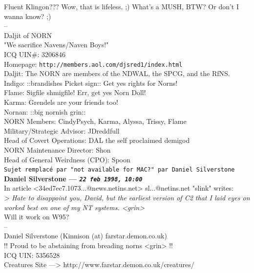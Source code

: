 \documentclass[11pt,twoside,a4paper]{article}
\begin{document}
\begin{multicols*}{2}
Fluent Klingon???  Wow, that is lifeless.  ;)  What's a MUSH, BTW?  Or don't I wanna know?  ;)~\\

-- ~\\
Daljit of NORN~\\
"We sacrifice Navens/Naven Boys!"~\\
ICQ UIN\#:  3206846~\\
Homepage:  \texttt{http://members.aol.com/djsred1/index.html}~\\

Daljit:  The NORN are members of the NDWAL, the SPCG, and the RfNS.~\\
Indigo:  ::brandishes Picket sign::  Get yes rights for Norns!~\\
Flame:  Sigfile shmigfile!  Err, get yes Norn Doll!~\\
Karma:  Grendels are your friends too!~\\
Nornan:  ::big nornish grin::~\\

NORN Members:  CindyPsych, Karma, Alyssa, Trissy, Flame~\\
Military/Strategic Advisor:  JDreddfull~\\
Head of Covert Operations:  DAL the self proclaimed demigod~\\
NORN Maintenance Director:  Shon~\\
Head of General Weirdness (CPO):  Spoon~\\

 
		
	
		
\texttt{Sujet remplac{\'e} par "not available for MAC?" par Daniel Silverstone}~\\
		
	
		
\textbf{Daniel Silverstone --- \emph{\texttt{22 feb 1998, 10:00}}}~\\

In article <34ed7ec7.1073...@news.netins.net> sl...@netins.net "slink" writes:~\\
\emph{> Hate to disappoint you, David, but the earliest version of C2 that I laid eyes on worked best on one of my NT systems.  <grin>}~\\

Will it work on W95?~\\

-- ~\\
Daniel Silverstone (Kinnison (at) farstar.demon.co.uk)~\\
        !! Proud to be abstaining from breading norns <grin> !!~\\
 ICQ UIN: 5356528~\\
Creatures Site ---> http://www.farstar.demon.co.uk/creatures/~\\


\end{multicols*}
\end{document}
